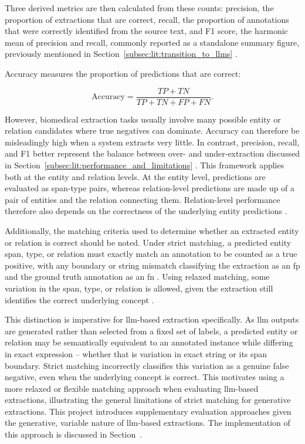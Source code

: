 Three derived metrics are then calculated from these counts: precision, the proportion of extractions that are correct, recall, the proportion of annotations that were correctly identified from the source text, and F1 score, the harmonic mean of precision and recall, commonly reported as a standalone summary figure, previously mentioned in Section~\ref{subsec:lit:transition_to_llms} \pref.

Accuracy measures the proportion of predictions that are correct:

\[
\text{Accuracy} = \frac{TP + TN}{TP + TN + FP + FN}.
\]

\vspace{1em}

\noindent However, biomedical extraction tasks usually involve many possible entity or relation candidates where true negatives can dominate. Accuracy can therefore be misleadingly high when a system extracts very little. In contrast, precision, recall, and F1 better represent the balance between over- and under-extraction discussed in Section~\ref{subsec:lit:performance_and_limitations} \pref. This framework applies both at the entity and relation levels. At the entity level, predictions are evaluated as span-type pairs, whereas relation-level predictions are made up of a pair of entities and the relation connecting them. Relation-level performance therefore also depends on the correctness of the underlying entity predictions \pref.

Additionally, the matching criteria used to determine whether an extracted entity or relation is correct should be noted. Under strict matching, a predicted entity span, type, or relation must exactly match an annotation to be counted as a true positive, with any boundary or string mismatch classifying the extraction as an \gls{fp} and the ground truth annotation as an \gls{fn} \pref. Using relaxed matching, some variation in the span, type, or relation is allowed, given the extraction still identifies the correct underlying concept \pref.

This distinction is imperative for \gls{llm}-based extraction specifically. As \gls{llm} outputs are generated rather than selected from a fixed set of labels, a predicted entity or relation may be semantically equivalent to an annotated instance while differing in exact expression -- whether that is variation in exact string or its span boundary. Strict matching incorrectly classifies this variation as a genuine false negative, even when the underlying concept is correct. This motivates using a more relaxed or flexible matching approach when evaluating \gls{llm}-based extractions, illustrating the general limitations of strict matching for generative extractions. This project introduces supplementary evaluation approaches given the generative, variable nature of \gls{llm}-based extractions. The implementation of this approach is discussed in Section~\dep.

